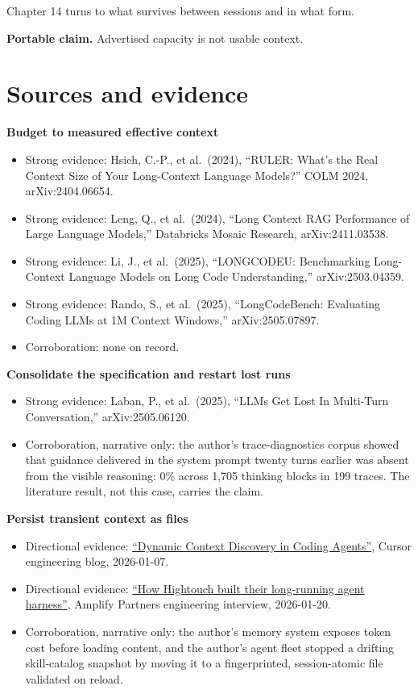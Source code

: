 Chapter 14 turns to what survives between sessions and in what form.

\textbf{Portable claim.} Advertised capacity is not usable context.

\section*{Sources and evidence}

\textbf{Budget to measured effective context}

\begin{itemize}
\tightlist
\item
  Strong evidence: Hsieh, C.-P., et al.~(2024), ``RULER: What's the Real Context Size of Your Long-Context Language Models?'' COLM 2024, arXiv:2404.06654.
\item
  Strong evidence: Leng, Q., et al.~(2024), ``Long Context RAG Performance of Large Language Models,'' Databricks Mosaic Research, arXiv:2411.03538.
\item
  Strong evidence: Li, J., et al.~(2025), ``LONGCODEU: Benchmarking Long-Context Language Models on Long Code Understanding,'' arXiv:2503.04359.
\item
  Strong evidence: Rando, S., et al.~(2025), ``LongCodeBench: Evaluating Coding LLMs at 1M Context Windows,'' arXiv:2505.07897.
\item
  Corroboration: none on record.
\end{itemize}

\textbf{Consolidate the specification and restart lost runs}

\begin{itemize}
\tightlist
\item
  Strong evidence: Laban, P., et al.~(2025), ``LLMs Get Lost In Multi-Turn Conversation,'' arXiv:2505.06120.
\item
  Corroboration, narrative only: the author's trace-diagnostics corpus showed that guidance delivered in the system prompt twenty turns earlier was absent from the visible reasoning: 0\% across 1,705 thinking blocks in 199 traces. The literature result, not this case, carries the claim.
\end{itemize}

\textbf{Persist transient context as files}

\begin{itemize}
\tightlist
\item
  Directional evidence: \href{https://cursor.com/blog/dynamic-context-discovery}{``Dynamic Context Discovery in Coding Agents''}, Cursor engineering blog, 2026-01-07.
\item
  Directional evidence: \href{https://www.amplifypartners.com/blog-posts/how-hightouch-built-their-long-running-agent-harness}{``How Hightouch built their long-running agent harness''}, Amplify Partners engineering interview, 2026-01-20.
\item
  Corroboration, narrative only: the author's memory system exposes token cost before loading content, and the author's agent fleet stopped a drifting skill-catalog snapshot by moving it to a fingerprinted, session-atomic file validated on reload.
\end{itemize}

